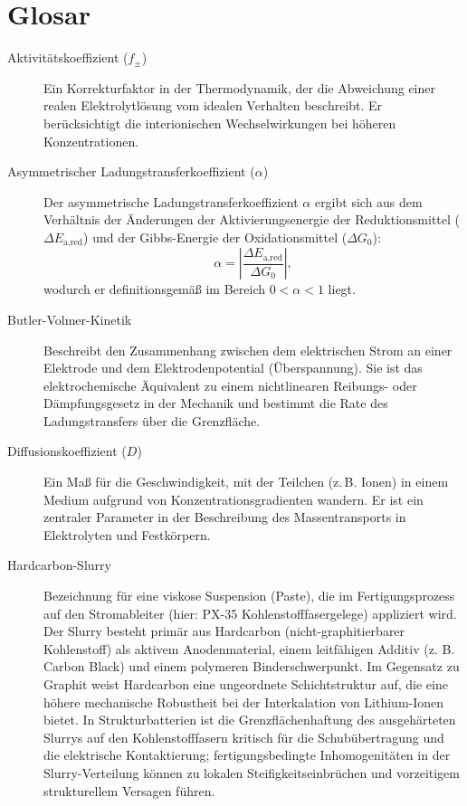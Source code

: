 \chapter{\label{sec:glosar}Glosar}

\begin{description}
    \item[Aktivitätskoeffizient ($f_{\pm}$)] Ein Korrekturfaktor in der Thermodynamik, der die Abweichung einer realen Elektrolytlösung vom idealen Verhalten beschreibt. Er berücksichtigt die interionischen Wechselwirkungen bei höheren Konzentrationen.
    
    \item[Asymmetrischer Ladungstransferkoeffizient ($\alpha$)] Der asymmetrische Ladungstransferkoeffizient $\alpha$ ergibt sich aus dem Verhältnis der Änderungen der Aktivierungsenergie der Reduktionsmittel ($\Delta E_{\text{a,red}}$) und der Gibbs-Energie der Oxidationsmittel ($\Delta G_0$): \begin{equation} \alpha = \left|\frac{\Delta E_{\text{a,red}}}{\Delta G_0}\right|, \end{equation} wodurch er definitionsgemäß im Bereich $0 < \alpha < 1$ liegt.

    \item[Butler-Volmer-Kinetik] Beschreibt den Zusammenhang zwischen dem elektrischen Strom an einer Elektrode und dem Elektrodenpotential (Überspannung). Sie ist das elektrochemische Äquivalent zu einem nichtlinearen Reibungs- oder Dämpfungsgesetz in der Mechanik und bestimmt die Rate des Ladungstransfers über die Grenzfläche.
    
    \item[Diffusionskoeffizient ($D$)] Ein Maß für die Geschwindigkeit, mit der Teilchen (z.\,B. Ionen) in einem Medium aufgrund von Konzentrationsgradienten wandern. Er ist ein zentraler Parameter in der Beschreibung des Massentransports in Elektrolyten und Festkörpern.

    \item[Hardcarbon-Slurry] Bezeichnung für eine viskose Suspension (Paste), die im Fertigungsprozess auf den Stromableiter (hier: PX-35 Kohlenstofffasergelege) appliziert wird. Der Slurry besteht primär aus Hardcarbon (nicht-graphitierbarer Kohlenstoff) als aktivem Anodenmaterial, einem leitfähigen Additiv (z. B. Carbon Black) und einem polymeren Binderschwerpunkt. Im Gegensatz zu Graphit weist Hardcarbon eine ungeordnete Schichtstruktur auf, die eine höhere mechanische Robustheit bei der Interkalation von Lithium-Ionen bietet. In Strukturbatterien ist die Grenzflächenhaftung des ausgehärteten Slurrys auf den Kohlenstofffasern kritisch für die Schubübertragung und die elektrische Kontaktierung; fertigungsbedingte Inhomogenitäten in der Slurry-Verteilung können zu lokalen Steifigkeitseinbrüchen und vorzeitigem strukturellem Versagen führen.


\end{description}
